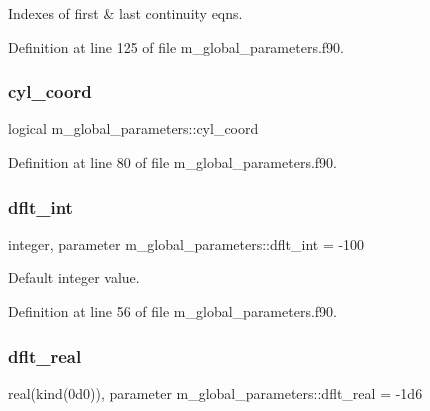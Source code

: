 Indexes of first \& last continuity eqns. 



Definition at line 125 of file m\+\_\+global\+\_\+parameters.\+f90.

\mbox{\label{namespacem__global__parameters_a53f0d5eed7783c9760aaeeaa0abbd58c}} 
\subsubsection{\texorpdfstring{cyl\+\_\+coord}{cyl\_coord}}
{\footnotesize\ttfamily logical m\+\_\+global\+\_\+parameters\+::cyl\+\_\+coord}



Definition at line 80 of file m\+\_\+global\+\_\+parameters.\+f90.

\mbox{\label{namespacem__global__parameters_a4e4e3806190a62a77cf6542f6d07dbbd}} 
\subsubsection{\texorpdfstring{dflt\+\_\+int}{dflt\_int}}
{\footnotesize\ttfamily integer, parameter m\+\_\+global\+\_\+parameters\+::dflt\+\_\+int = -\/100}



Default integer value. 



Definition at line 56 of file m\+\_\+global\+\_\+parameters.\+f90.

\mbox{\label{namespacem__global__parameters_a99ba7e33a1870ac89386d376e0d20526}} 
\subsubsection{\texorpdfstring{dflt\+\_\+real}{dflt\_real}}
{\footnotesize\ttfamily real(kind(0d0)), parameter m\+\_\+global\+\_\+parameters\+::dflt\+\_\+real = -\/1d6}



